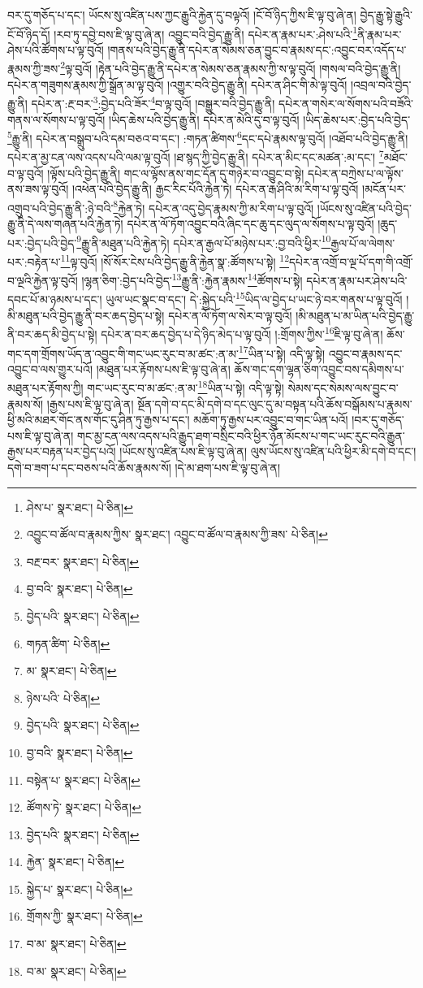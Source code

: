 བར་དུ་གཅོད་པ་དང་། ཡོངས་སུ་འཛིན་པས་ཀྱང་རྒྱུའི་རྐྱེན་དུ་བལྟའོ། །ངོ་བོ་ཉིད་ཀྱིས་ཇི་ལྟ་བུ་ཞེ་ན། བྱེད་རྒྱུ་སྟེ་རྒྱུའི་ངོ་བོ་ཉིད་དོ། །རབ་ཏུ་དབྱེ་བས་ཇི་ལྟ་བུ་ཞེ་ན། འབྱུང་བའི་བྱེད་རྒྱུ་ནི། དཔེར་ན་རྣམ་པར་:ཤེས་པའི་\footnote{ཤེས་པ་  སྣར་ཐང་།  པེ་ཅིན། }ནི་རྣམ་པར་ཤེས་པའི་ཚོགས་པ་ལྟ་བུའོ། །གནས་པའི་བྱེད་རྒྱུ་ནི་དཔེར་ན་སེམས་ཅན་བྱུང་བ་རྣམས་དང་:འབྱུང་བར་འདོད་པ་རྣམས་ཀྱི་ཟས་\footnote{འབྱུང་བ་ཚོལ་བ་རྣམས་ཀྱིས་  སྣར་ཐང་། འབྱུང་བ་ཚོལ་བ་རྣམས་ཀྱི་ཟས་  པེ་ཅིན། }ལྟ་བུའོ། །རྟེན་པའི་བྱེད་རྒྱུ་ནི་དཔེར་ན་སེམས་ཅན་རྣམས་ཀྱི་ས་ལྟ་བུའོ། །གསལ་བའི་བྱེད་རྒྱུ་ནི། དཔེར་ན་གཟུགས་རྣམས་ཀྱི་སྒྲོན་མ་ལྟ་བུའོ། །འགྱུར་བའི་བྱེད་རྒྱུ་ནི། དཔེར་ན་ཤིང་གི་མེ་ལྟ་བུའོ། །འབྲལ་བའི་བྱེད་རྒྱུ་ནི། དཔེར་ན་:རྔ་བར་\footnote{བརྔ་བར་  སྣར་ཐང་།  པེ་ཅིན། }:བྱེད་པའི་ཟོར་\footnote{བྱ་བའི་  སྣར་ཐང་།  པེ་ཅིན། }བ་ལྟ་བུའོ། །བསྒྱུར་བའི་བྱེད་རྒྱུ་ནི། དཔེར་ན་གསེར་ལ་སོགས་པའི་བཟོའི་གནས་ལ་སོགས་པ་ལྟ་བུའོ། །ཡིད་ཆེས་པའི་བྱེད་རྒྱུ་ནི། དཔེར་ན་མེའི་དུ་བ་ལྟ་བུའོ། །ཡིད་ཆེས་པར་:བྱེད་པའི་བྱེད་\footnote{བྱེད་པའི་  སྣར་ཐང་།  པེ་ཅིན། }རྒྱུ་ནི། དཔེར་ན་བསྒྲུབ་པའི་དམ་བཅའ་བ་དང་། :གཏན་ཚིགས་\footnote{གཏན་ཚིག་  པེ་ཅིན། }དང་དཔེ་རྣམས་ལྟ་བུའོ། །འཐོབ་པའི་བྱེད་རྒྱུ་ནི། དཔེར་ན་མྱ་ངན་ལས་འདས་པའི་ལམ་ལྟ་བུའོ། །ཐ་སྙད་ཀྱི་བྱེད་རྒྱུ་ནི། དཔེར་ན་མིང་དང་མཚན་:མ་དང་། \footnote{མ་  སྣར་ཐང་།  པེ་ཅིན། }མཐོང་བ་ལྟ་བུའོ། །ལྟོས་པའི་བྱེད་རྒྱུ་ནི། གང་ལ་ལྟོས་ནས་གང་དོན་དུ་གཉེར་བ་འབྱུང་བ་སྟེ། དཔེར་ན་བཀྲེས་པ་ལ་ལྟོས་ནས་ཟས་ལྟ་བུའོ། །འཕེན་པའི་བྱེད་རྒྱུ་ནི། རྒྱང་རིང་པོའི་རྐྱེན་ཏེ། དཔེར་ན་རྒ་ཤིའི་མ་རིག་པ་ལྟ་བུའོ། །མངོན་པར་འགྲུབ་པའི་བྱེད་རྒྱུ་ནི་:ཉེ་བའི་\footnote{ཉེས་པའི་  པེ་ཅིན། }རྐྱེན་ཏེ། དཔེར་ན་འདུ་བྱེད་རྣམས་ཀྱི་མ་རིག་པ་ལྟ་བུའོ། །ཡོངས་སུ་འཛིན་པའི་བྱེད་རྒྱུ་ནི་དེ་ལས་གཞན་པའི་རྐྱེན་ཏེ། དཔེར་ན་ལོ་ཏོག་འབྱུང་བའི་ཞིང་དང་ཆུ་དང་ལུད་ལ་སོགས་པ་ལྟ་བུའོ། །ཆུད་པར་:བྱེད་པའི་བྱེད་\footnote{བྱེད་པའི་  སྣར་ཐང་།  པེ་ཅིན། }རྒྱུ་ནི་མཐུན་པའི་རྐྱེན་ཏེ། དཔེར་ན་རྒྱལ་པོ་མཉེས་པར་:བྱ་བའི་ཕྱིར་\footnote{བྱ་བའི་  སྣར་ཐང་།  པེ་ཅིན། }རྒྱལ་པོ་ལ་ལེགས་པར་:བརྟེན་པ་\footnote{བསྟེན་པ་  སྣར་ཐང་།  པེ་ཅིན། }ལྟ་བུའོ། །སོ་སོར་ངེས་པའི་བྱེད་རྒྱུ་ནི་རྐྱེན་སྣ་:ཚོགས་པ་སྟེ། \footnote{ཚོགས་ཏེ་  སྣར་ཐང་།  པེ་ཅིན། }དཔེར་ན་འགྲོ་བ་ལྔ་པོ་དག་གི་འགྲོ་བ་ལྔའི་རྐྱེན་ལྟ་བུའོ། །ལྷན་ཅིག་:བྱེད་པའི་བྱེད་\footnote{བྱེད་པའི་  སྣར་ཐང་།  པེ་ཅིན། }རྒྱུ་ནི་:རྐྱེན་རྣམས་\footnote{རྐྱེན་  སྣར་ཐང་།  པེ་ཅིན། }ཚོགས་པ་སྟེ། དཔེར་ན་རྣམ་པར་ཤེས་པའི་དབང་པོ་མ་ཉམས་པ་དང་། ཡུལ་ཡང་སྣང་བ་དང་། དེ་:སྐྱེད་པའི་\footnote{སྐྱེད་པ་  སྣར་ཐང་།  པེ་ཅིན། }ཡིད་ལ་བྱེད་པ་ཡང་ཉེ་བར་གནས་པ་ལྟ་བུའོ། །མི་མཐུན་པའི་བྱེད་རྒྱུ་ནི་བར་ཆད་བྱེད་པ་སྟེ། དཔེར་ན་ལོ་ཏོག་ལ་སེར་བ་ལྟ་བུའོ། །མི་མཐུན་པ་མ་ཡིན་པའི་བྱེད་རྒྱུ་ནི་བར་ཆད་མི་བྱེད་པ་སྟེ། དཔེར་ན་བར་ཆད་བྱེད་པ་དེ་ཉིད་མེད་པ་ལྟ་བུའོ། །:གྲོགས་ཀྱིས་\footnote{གྲོགས་ཀྱི་  སྣར་ཐང་།  པེ་ཅིན། }ཇི་ལྟ་བུ་ཞེ་ན། ཆོས་གང་དག་གྲོགས་ཡོད་ན་འབྱུང་གི་གང་ཡང་རུང་བ་མ་ཚང་:ན་མ་\footnote{བ་མ་  སྣར་ཐང་།  པེ་ཅིན། }ཡིན་པ་སྟེ། འདི་ལྟ་སྟེ། འབྱུང་བ་རྣམས་དང་འབྱུང་བ་ལས་གྱུར་པའོ། །མཐུན་པར་རྟོགས་པས་ཇི་ལྟ་བུ་ཞེ་ན། ཆོས་གང་དག་ལྷན་ཅིག་འབྱུང་བས་དམིགས་པ་མཐུན་པར་རྟོགས་ཀྱི། གང་ཡང་རུང་བ་མ་ཚང་:ན་མ་\footnote{བ་མ་  སྣར་ཐང་།  པེ་ཅིན། }ཡིན་པ་སྟེ། འདི་ལྟ་སྟེ། སེམས་དང་སེམས་ལས་བྱུང་བ་རྣམས་སོ། །རྒྱས་པས་ཇི་ལྟ་བུ་ཞེ་ན། སྔོན་དགེ་བ་དང་མི་དགེ་བ་དང་ལུང་དུ་མ་བསྟན་པའི་ཆོས་བསྒོམས་པ་རྣམས་ཕྱི་མའི་མཐར་གོང་ནས་གོང་དུ་ཤིན་ཏུ་རྒྱས་པ་དང་། མཆོག་ཏུ་རྒྱས་པར་འབྱུང་བ་གང་ཡིན་པའོ། །བར་དུ་གཅོད་པས་ཇི་ལྟ་བུ་ཞེ་ན། གང་མྱ་ངན་ལས་འདས་པའི་རྒྱུད་ཐག་བསྲིང་བའི་ཕྱིར་ཉོན་མོངས་པ་གང་ཡང་རུང་བའི་རྒྱུན་རྒྱས་པར་བརྟན་པར་བྱེད་པའོ། །ཡོངས་སུ་འཛིན་པས་ཇི་ལྟ་བུ་ཞེ་ན། ལུས་ཡོངས་སུ་འཛིན་པའི་ཕྱིར་མི་དགེ་བ་དང་། དགེ་བ་ཟག་པ་དང་བཅས་པའི་ཆོས་རྣམས་སོ། །དེ་མ་ཐག་པས་ཇི་ལྟ་བུ་ཞེ་ན། 